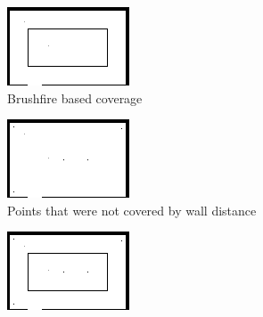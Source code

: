 \begin{figure}[ht]
\centering
  \begin{subfigure}[t]{0.3\textwidth}
    \includegraphics[width = \textwidth]{graphics/sq/dist}
    \caption{Brushfire based coverage}
    \label{sqdist}
  \end{subfigure}
  \begin{subfigure}[t]{0.3\textwidth}
    \includegraphics[width = \textwidth]{graphics/sq/top}
    \caption{Points that were not covered by wall distance}
    \label{sqtop}
  \end{subfigure}  
  \begin{subfigure}[t]{0.3\textwidth}
    \includegraphics[width = \textwidth]{graphics/sq/list}

\end{subfigure}
\end{figure}
